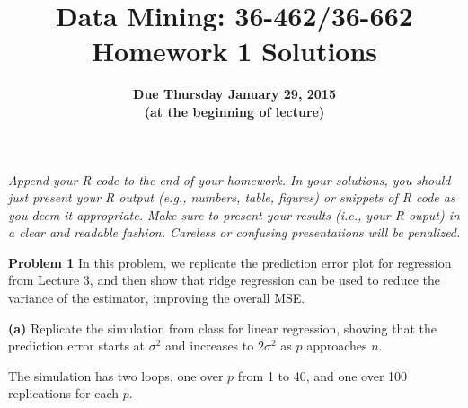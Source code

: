 \documentclass[11pt]{article}
\title{Data Mining: 36-462/36-662 \\ Homework 1 Solutions}
\author{\bf Due Thursday January 29, 2015 \\
(at the beginning of lecture)}
\date{}
\begin{document}
\maketitle

{\it Append your R code to the end of your homework. In your solutions, you should
just present your R output (e.g., numbers, table, figures) or snippets of R
code as you deem it appropriate. Make sure to present your results (i.e., your
R ouput) in a clear and readable fashion. Careless or confusing presentations 
will be penalized.}

\bigskip
\bigskip
\noindent
{\bf\large Problem 1}
In this problem, we replicate the prediction error plot for regression from
Lecture 3, and then show that ridge regression can be used to reduce the
variance of the estimator, improving the overall MSE.

\bigskip
\noindent
{\bf (a)} Replicate the simulation from class for linear regression, showing
that the prediction error starts at $\sigma^2$ and increases to $2\sigma^2$ as
$p$ approaches $n$.

The simulation has two loops, one over $p$ from 1 to 40, and one over 100
replications for each $p$.
\end{document}
